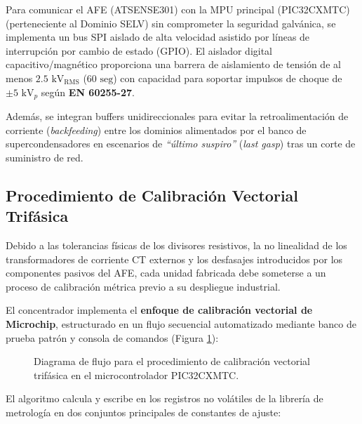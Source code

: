 Para comunicar el  AFE (ATSENSE301) con la MPU principal (PIC32CXMTC) (perteneciente al Dominio SELV) sin comprometer la seguridad galvánica, se implementa un bus SPI aislado de alta velocidad asistido por líneas de interrupción por cambio de estado (GPIO). El aislador digital capacitivo/magnético proporciona una barrera de aislamiento de tensión de al menos $2.5\text{ kV}_{\text{RMS}}$ ($60\text{ seg}$) con capacidad para soportar impulsos de choque de $\pm 5\text{ kV}_p$ según \textbf{EN 60255-27}. 

Además, se integran buffers unidireccionales para evitar la retroalimentación de corriente (\textit{backfeeding}) entre los dominios alimentados por el banco de supercondensadores en escenarios de \textit{``último suspiro''} (\textit{last gasp}) tras un corte de suministro de red.

\subsection{Procedimiento de Calibración Vectorial Trifásica}
\label{subsec:calibracion_vectorial}

Debido a las tolerancias físicas de los divisores resistivos, la no linealidad de los transformadores de corriente CT externos y los desfasajes introducidos por los componentes pasivos del AFE, cada unidad fabricada debe someterse a un proceso de calibración métrica previo a su despliegue industrial. 

El concentrador implementa el \textbf{enfoque de calibración vectorial de Microchip}, estructurado en un flujo secuencial automatizado mediante banco de prueba patrón y consola de comandos (Figura \ref{fig:flujo_calibracion_vectorial}):

\begin{figure}[htbp]
    \centering
    \caption{Diagrama de flujo para el procedimiento de calibración vectorial trifásica en el microcontrolador PIC32CXMTC.}
    \label{fig:flujo_calibracion_vectorial}
\end{figure}

El algoritmo calcula y escribe en los registros no volátiles de la librería de metrología en dos conjuntos principales de constantes de ajuste:

